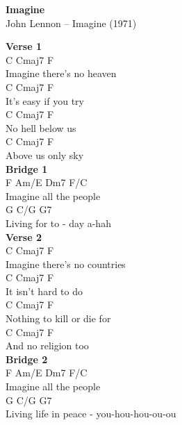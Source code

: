 \documentclass[a4paper]{article}
\begin{document}
    \begin{center}
        \textbf{Imagine}
        ~\\
        John Lennon -- Imagine (1971)
    \end{center}
    {
        \scriptsize
        \textbf{Verse 1}
        ~\\
        {
            \cutive
            \obeyspaces
C                Cmaj7 F
\\
 Imagine there's no    heaven
\\
C             Cmaj7 F
\\
 It's easy if you   try
\\
C        Cmaj7 F
\\
 No hell below us
\\
C          Cmaj7 F
\\
  Above us only  sky
\\

        }
        \textbf{Bridge 1}
        ~\\
        {
            \cutive
            \obeyspaces
F        Am/E    Dm7   F/C
\\
 Imagine all the people
\\
G          C/G  G7
\\
Living for to - day a-hah
\\

        }
        \textbf{Verse 2}
        ~\\
        {
            \cutive
            \obeyspaces
C                 Cmaj7 F
\\
  Imagine there's no    countries
\\
C               Cmaj7 F
\\
  It isn't hard to    do
\\
C                 Cmaj7 F
\\
  Nothing to kill or    die for
\\
C             Cmaj7 F
\\
  And no religion   too
\\

        }
        \textbf{Bridge 2}
        ~\\
        {
            \cutive
            \obeyspaces
F        Am/E    Dm7   F/C
\\
 Imagine all the people
\\
G           C/G G7
\\
Living life in  peace - you-hou-hou-ou-ou
\\

}}
\end{document}
